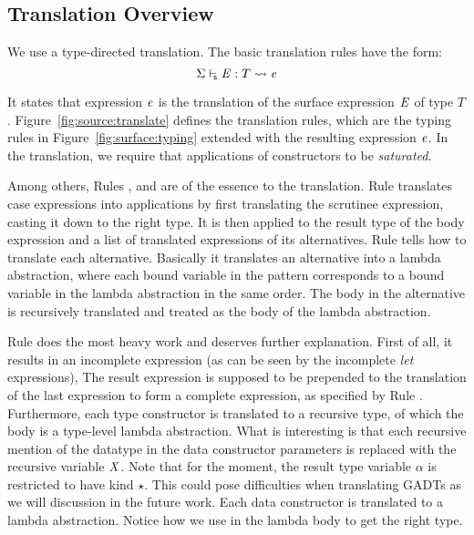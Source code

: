\subsection{Translation Overview}

We use a type-directed translation. The basic translation rules have the form:
\[
 \Sigma  \vdash_{\!\!\mathsf{s} }  \mathit{E}  :  T   \rightsquigarrow   \mathit{e} 
\]

It states that \name expression $\mathit{e}$ is the translation of the
surface expression $\mathit{E}$ of type $T$.
Figure~\ref{fig:source:translate} defines the translation rules, which
are the typing rules in Figure~\ref{fig:surface:typing} extended with
the resulting expression $\mathit{e}$. In the translation, we require that
applications of constructors to be \emph{saturated}.

Among others, Rules ,  and  are of the essence to the translation. Rule  translates case expressions into applications by first translating the scrutinee expression, casting it down to the right type. It is then applied to the result type of the body expression and a list of translated \name expressions of its alternatives. Rule  tells how to translate each alternative. Basically it translates an alternative into a lambda abstraction, where each bound variable in the pattern corresponds to a bound variable in the lambda abstraction in the same order. The body in the alternative is recursively translated and treated as the body of the lambda abstraction.

Rule  does the most heavy work and deserves further explanation. First of all, it results in an incomplete expression (as can be seen by the incomplete \emph{let} expressions), The result expression is supposed to be prepended to the translation of the last expression to form a complete \name expression, as specified by Rule . Furthermore, each type constructor is translated to a recursive type, of which the body is a type-level lambda abstraction. What is interesting is that each recursive mention of the datatype in the data constructor parameters is replaced with the recursive variable $\mathit{X}$. Note that for the moment, the result type variable $\alpha$ is restricted to have kind $\star$. This could pose difficulties when translating GADTs as we will discussion in the future work. Each data constructor is translated to a lambda abstraction. Notice how we use \castup in the lambda body to get the right type.

